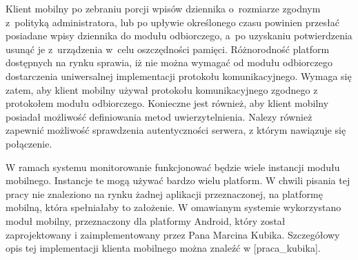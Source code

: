Klient mobilny po zebraniu porcji wpisów dziennika o~rozmiarze zgodnym
z~polityką administratora, lub po upływie określonego czasu powinien
przesłać posiadane wpisy dziennika do modułu odbiorczego, a~po
uzyskaniu potwierdzenia usunąć je z~urządzenia w~celu oszczędności
pamięci. Różnorodność platform dostępnych na rynku sprawia, iż nie
można wymagać od modułu odbiorczego dostarczenia uniwersalnej
implementacji protokołu komunikacyjnego. Wymaga się zatem, aby klient
mobilny używał protokołu komunikacyjnego zgodnego z protokołem modułu
odbiorczego. Konieczne jest również, aby klient mobilny posiadał
możliwość definiowania metod uwierzytelnienia. Nalezy również zapewnić
możliwość sprawdzenia autentyczności serwera, z którym nawiązuje się
połączenie.

W ramach systemu monitorowanie funkcjonować będzie wiele instancji
modułu mobilnego. Instancje te mogą używać bardzo wielu platform. W
chwili pisania tej pracy nie znaleziono na rynku żadnej aplikacji
przeznaczonej, na platformę mobilną, która spełniałaby to założenie. W
omawianym systemie wykorzystano moduł mobilny, przeznaczony dla
platformy Android, który został zaprojektowany i zaimplementowany
przez Pana Marcina Kubika. Szczegółowy opis tej implementacji klienta
mobilnego można znaleźć w [praca\_kubika].
